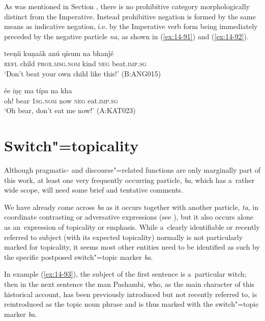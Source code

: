 As was mentioned in Section , there is no prohibitive category morphologically distinct from the Imperative. Instead prohibitive negation is formed by the same means as indicative negation, i.e. by the Imperative verb form being immediately preceded by the negative particle \textit{na}, as shown in (\ref{ex:14-91}) and (\ref{ex:14-92}).

\begin{exe}
\ex
\label{ex:14-91}
\gll teeṇíi kuṇaák anú qísum na bhanǰé \\
\textsc{refl} child \textsc{prox.msg.nom} kind \textsc{neg} beat.\textsc{imp.sg}  \\
\glt `Don't beat your own child like this!' (B:ANG015)

\ex
\label{ex:14-92}
\gll ée iṇc̣ ma típa na kha \\
oh! bear \textsc{1sg.nom} now \textsc{neg} eat.\textsc{imp.sg } \\
\glt `Oh bear, don't eat me now!' (A:KAT023)
\end{exe}

\section{Switch"=topicality}
\label{sec:14-4}


Although pragmatic- and discourse"=related functions are only marginally part of this work, at least one very frequently occurring particle, \textit{ba}, which has a~rather wide scope, will need some brief and tentative comments.



We have already come across \textit{ba} as it occurs together with another particle, \textit{ta}, in coordinate contrasting or adversative expressions (see ), but it also occurs alone as an~expression of topicality or emphasis. While a~clearly identifiable or recently referred to subject (with its expected topicality) normally is not particularly marked for topicality, it seems most other entities need to be identified as such by the specific postposed switch"=topic \citep[149]{andrews2007} marker \textit{ba}.



In example (\ref{ex:14-93}), the subject of the first sentence is a~particular witch; then in the next sentence the man Pashambi, who, as the main character of this historical account, has been previously introduced but not recently referred to, is reintroduced as the topic noun phrase and is thus marked with the switch"=topic marker \textit{ba}.

